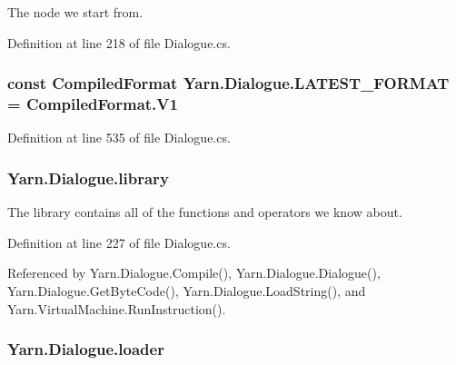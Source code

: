 The node we start from. 



Definition at line 218 of file Dialogue.\-cs.

\hypertarget{a00090_a3bc83587462ade6a2f7f42cb7576e50e}{
\subsubsection[{L\-A\-T\-E\-S\-T\-\_\-\-F\-O\-R\-M\-A\-T}]{\setlength{\rightskip}{0pt plus 5cm}const {\bf Compiled\-Format} Yarn.\-Dialogue.\-L\-A\-T\-E\-S\-T\-\_\-\-F\-O\-R\-M\-A\-T = Compiled\-Format.\-V1}}\label{a00090_a3bc83587462ade6a2f7f42cb7576e50e}


Definition at line 535 of file Dialogue.\-cs.

\hypertarget{a00090_ae660d4cfb6e296358d2f61d8ee74c66a}{
\subsubsection[{library}]{ Yarn.\-Dialogue.\-library}}\label{a00090_ae660d4cfb6e296358d2f61d8ee74c66a}


The library contains all of the functions and operators we know about. 



Definition at line 227 of file Dialogue.\-cs.



Referenced by Yarn.\-Dialogue.\-Compile(), Yarn.\-Dialogue.\-Dialogue(), Yarn.\-Dialogue.\-Get\-Byte\-Code(), Yarn.\-Dialogue.\-Load\-String(), and Yarn.\-Virtual\-Machine.\-Run\-Instruction().

\hypertarget{a00090_a98bbe0ac2ccadeeeb7e05e3e6e19f2e0}{
\subsubsection[{loader}]{ Yarn.\-Dialogue.\-loader\hspace{0.3cm}{\ttfamily [package]}}}\label{a00090_a98bbe0ac2ccadeeeb7e05e3e6e19f2e0}


